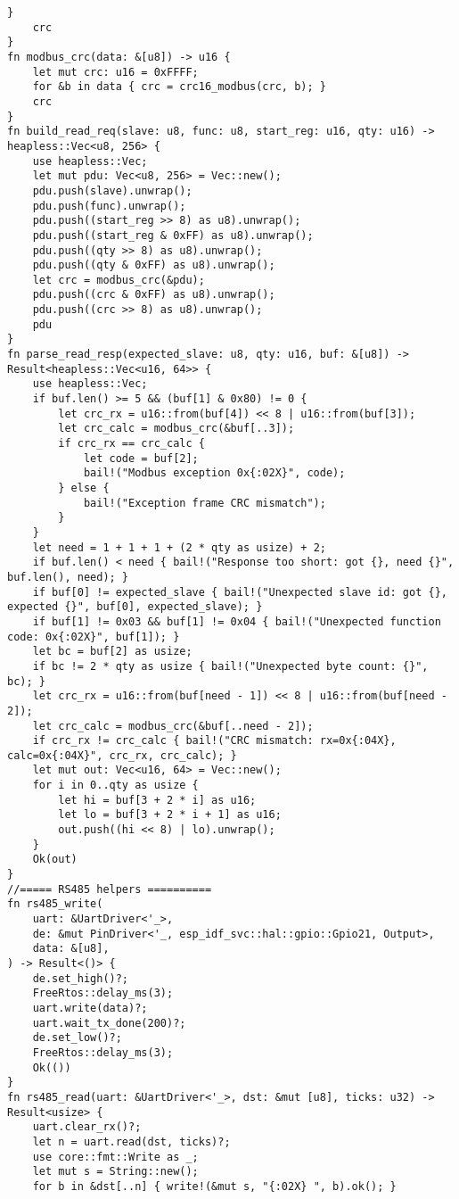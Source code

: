 \documentclass[a4paper, 12pt]{article}
\begin{document}
\begin{lstlisting}[style=ruststyle, caption={main.rs}, basicstyle=\ttfamily\tiny]
    }
    crc
}
fn modbus_crc(data: &[u8]) -> u16 {
    let mut crc: u16 = 0xFFFF;
    for &b in data { crc = crc16_modbus(crc, b); }
    crc
}
fn build_read_req(slave: u8, func: u8, start_reg: u16, qty: u16) -> heapless::Vec<u8, 256> {
    use heapless::Vec;
    let mut pdu: Vec<u8, 256> = Vec::new();
    pdu.push(slave).unwrap();
    pdu.push(func).unwrap();
    pdu.push((start_reg >> 8) as u8).unwrap();
    pdu.push((start_reg & 0xFF) as u8).unwrap();
    pdu.push((qty >> 8) as u8).unwrap();
    pdu.push((qty & 0xFF) as u8).unwrap();
    let crc = modbus_crc(&pdu);
    pdu.push((crc & 0xFF) as u8).unwrap();
    pdu.push((crc >> 8) as u8).unwrap();
    pdu
}
fn parse_read_resp(expected_slave: u8, qty: u16, buf: &[u8]) -> Result<heapless::Vec<u16, 64>> {
    use heapless::Vec;
    if buf.len() >= 5 && (buf[1] & 0x80) != 0 {
        let crc_rx = u16::from(buf[4]) << 8 | u16::from(buf[3]);
        let crc_calc = modbus_crc(&buf[..3]);
        if crc_rx == crc_calc {
            let code = buf[2];
            bail!("Modbus exception 0x{:02X}", code);
        } else {
            bail!("Exception frame CRC mismatch");
        }
    }
    let need = 1 + 1 + 1 + (2 * qty as usize) + 2;
    if buf.len() < need { bail!("Response too short: got {}, need {}", buf.len(), need); }
    if buf[0] != expected_slave { bail!("Unexpected slave id: got {}, expected {}", buf[0], expected_slave); }
    if buf[1] != 0x03 && buf[1] != 0x04 { bail!("Unexpected function code: 0x{:02X}", buf[1]); }
    let bc = buf[2] as usize;
    if bc != 2 * qty as usize { bail!("Unexpected byte count: {}", bc); }
    let crc_rx = u16::from(buf[need - 1]) << 8 | u16::from(buf[need - 2]);
    let crc_calc = modbus_crc(&buf[..need - 2]);
    if crc_rx != crc_calc { bail!("CRC mismatch: rx=0x{:04X}, calc=0x{:04X}", crc_rx, crc_calc); }
    let mut out: Vec<u16, 64> = Vec::new();
    for i in 0..qty as usize {
        let hi = buf[3 + 2 * i] as u16;
        let lo = buf[3 + 2 * i + 1] as u16;
        out.push((hi << 8) | lo).unwrap();
    }
    Ok(out)
}
//===== RS485 helpers ==========
fn rs485_write(
    uart: &UartDriver<'_>,
    de: &mut PinDriver<'_, esp_idf_svc::hal::gpio::Gpio21, Output>,
    data: &[u8],
) -> Result<()> {
    de.set_high()?;
    FreeRtos::delay_ms(3);
    uart.write(data)?;
    uart.wait_tx_done(200)?;
    de.set_low()?;
    FreeRtos::delay_ms(3);
    Ok(())
}
fn rs485_read(uart: &UartDriver<'_>, dst: &mut [u8], ticks: u32) -> Result<usize> {
    uart.clear_rx()?;
    let n = uart.read(dst, ticks)?;
    use core::fmt::Write as _;
    let mut s = String::new();
    for b in &dst[..n] { write!(&mut s, "{:02X} ", b).ok(); }

\end{lstlisting}
\end{document}
